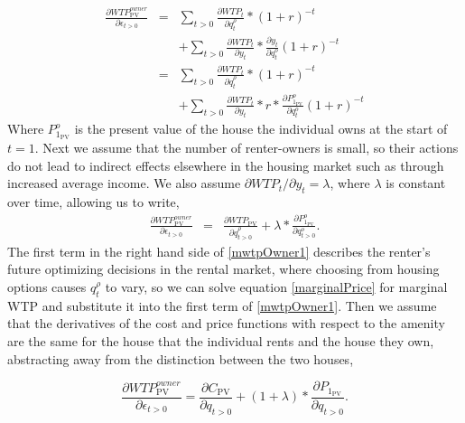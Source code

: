 \documentclass[ecta,nameyear,draft]{econsocart}
\theoremstyle{plain}
\theoremstyle{remark}
\begin{document}
\begin{eqnarray}
	\frac{\partial \mathit{WTP}^{\mathit{owner}}_{\mathrm{PV}}}{\partial \epsilon_{t>0}}&=&\sum_{t>0}\frac{\partial \mathit{WTP}_t}{\partial q^\rho_t}*(1+r)^{-t} \nonumber\\
	&& +\sum_{t>0}\frac{\partial \mathit{WTP}_t}{\partial y_t}*\frac{\partial y_t}{\partial q_t^o}(1+r)^{-t} \nonumber\\
	&=&\sum_{t>0}\frac{\partial \mathit{WTP}_t}{\partial q_t^\rho}*(1+r)^{-t}\nonumber\\
	&& +\sum_{t>0}\frac{\partial \mathit{WTP}_t}{\partial y_t}*r*\frac{\partial P^o_{1_\mathrm{PV}}}{\partial q_t^o}(1+r)^{-t} \label{mwtpOwner0}
\end{eqnarray}
Where $P^o_{1_\mathrm{PV}}$ is the present value of the house the individual owns at the start of $t=1$. Next we assume that the number of renter-owners is small, so their actions do not lead to indirect effects  elsewhere in the housing market such as through increased average income. We also assume $\partial \mathit{WTP}_t/\partial y_t=\lambda$, where $\lambda$ is constant over time, allowing us to write,
\begin{eqnarray}
	\frac{\partial \mathit{WTP}^{\mathit{owner}}_{\mathrm{PV}}}{\partial \epsilon_{t>0}} 
	&=&\frac{\partial \mathit{WTP_{\mathrm{PV}}}}{\partial q^\rho_{t>0}} + \lambda*\frac{\partial P^o_{1_\mathrm{PV}}}{\partial q_{t>0}^o} \label{mwtpOwner1}.
\end{eqnarray}
The first term in the right hand side of \ref{mwtpOwner1} describes the renter's future optimizing decisions in the rental market, where choosing from housing options causes $q_t^\rho$ to vary, so we can solve equation \ref{marginalPrice} for marginal WTP and substitute it into the first term of \ref{mwtpOwner1}. Then we assume that the derivatives of the cost and price functions with respect to the amenity are the same for the house that the individual rents and the house they own, abstracting away from the distinction between the two houses, 

\begin{equation}
	\frac{\partial \mathit{WTP}^{\mathit{owner}}_{\mathrm{PV}}}{\partial \epsilon_{t>0}} =	\frac{\partial C_{\mathrm{PV}}}{\partial q_{t>0}}+(1+\lambda)*\frac{\partial P_{1_\mathrm{PV}}}{\partial q_{t>0}}.
\end{equation}
\end{document}
